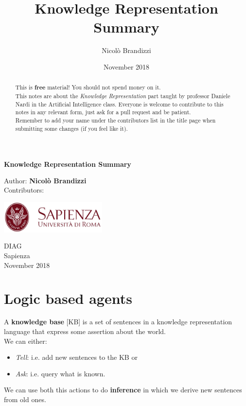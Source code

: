 \documentclass[10pt,a4paper]{article}
\author{Nicolò Brandizzi}
\title{Knowledge Representation Summary}
\date{November 2018}
\begin{document}
\begin{titlepage}
    \begin{center}
        \vspace*{1cm}
        
        \Huge
        \textbf{Knowledge Representation Summary}
        
        
        \vspace{1.5cm}
        
        Author:
        \textbf{Nicolò Brandizzi}\\
        \vspace{0.5cm}
        \Large
        Contributors:
        \textbf{}%
        
        \vfill
        
        \includegraphics[width=0.4\textwidth]{images/sapienza_logo.jpg}


        
        \vfill
        
  

        \vspace{0.8cm}
        
        
        \Large
        DIAG\\
        Sapienza\\
        November 2018

    \end{center}
\end{titlepage}


\tableofcontents
\newpage
\begin{abstract}
This is \textbf{free} material! You should not spend money on it.\\
This notes are about the \textit{Knowledge Representation} part taught by professor Daniele Nardi in the Artificial Intelligence class. Everyone is welcome to contribute to this notes in any relevant form, just ask for a pull request and be patient.\\ Remember to add your name under the contributors list in the title page when submitting some changes (if you feel like it).
\end{abstract}

\newpage

\section{Logic based agents}
A \textbf{knowledge base} [KB] is a set of sentences in a knowledge representation language that express some assertion about the world.\\
We can either:
\begin{itemize}
\item \textit{Tell}: i.e. add new sentences to the KB or
\item \textit{Ask}: i.e. query what is known.
\end{itemize}
We can use both this actions to do \textbf{inference} in which we derive new sentences from old ones.\\
\end{document}

